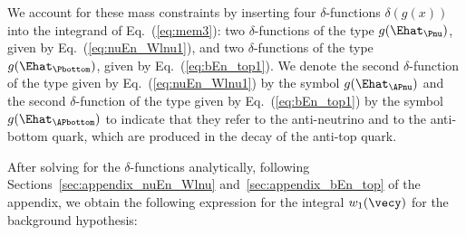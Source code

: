 We account for these mass constraints by inserting four $\delta$-functions $\delta\left( g(x) \right)$ into the integrand of Eq.~(\ref{eq:mem3}):
two $\delta$-functions of the type $g(\Ehat_{\Pnu})$, given by Eq.~(\ref{eq:nuEn_Wlnu1}),
and two $\delta$-functions of the type $g(\Ehat_{\Pbottom})$, given by Eq.~(\ref{eq:bEn_top1}).
We denote the second $\delta$-function of the type given by Eq.~(\ref{eq:nuEn_Wlnu1}) by the symbol $g(\Ehat_{\APnu})$
and the second $\delta$-function of the type given by Eq.~(\ref{eq:bEn_top1}) by the symbol $g(\Ehat_{\APbottom})$
to indicate that they refer to the anti-neutrino and to the anti-bottom quark, which are produced in the decay of the anti-top quark.

After solving for the $\delta$-functions analytically, following Sections~\ref{sec:appendix_nuEn_Wlnu} and~\ref{sec:appendix_bEn_top} of the appendix,
we obtain the following expression for the integral $w_{1}(\vecy)$ for the background hypothesis:
